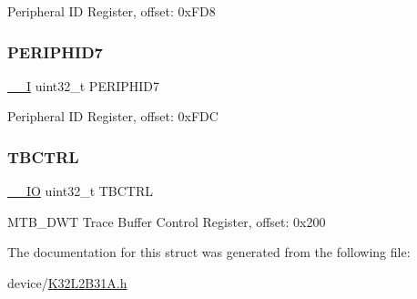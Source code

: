 Peripheral ID Register, offset\+: 0x\+F\+D8 \mbox{\label{struct_m_t_b_d_w_t___type_ace00880bb4cdd91134d59cd85324c681}} 
\subsubsection{\texorpdfstring{PERIPHID7}{PERIPHID7}}
{\footnotesize\ttfamily \mbox{\hyperlink{core__cm0plus_8h_af63697ed9952cc71e1225efe205f6cd3}{\+\_\+\+\_\+I}} uint32\+\_\+t P\+E\+R\+I\+P\+H\+I\+D7}

Peripheral ID Register, offset\+: 0x\+F\+DC \mbox{\label{struct_m_t_b_d_w_t___type_a2ccafb211d059f7673357ae5bd2c6f18}} 
\subsubsection{\texorpdfstring{TBCTRL}{TBCTRL}}
{\footnotesize\ttfamily \mbox{\hyperlink{core__cm0plus_8h_aec43007d9998a0a0e01faede4133d6be}{\+\_\+\+\_\+\+IO}} uint32\+\_\+t T\+B\+C\+T\+RL}

M\+T\+B\+\_\+\+D\+WT Trace Buffer Control Register, offset\+: 0x200 

The documentation for this struct was generated from the following file\+:\begin{DoxyCompactItemize}
\item 
device/\mbox{\hyperlink{_k32_l2_b31_a_8h}{K32\+L2\+B31\+A.\+h}}\end{DoxyCompactItemize}
